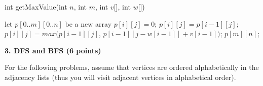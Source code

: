 \documentclass[12pt]{elsart}
\begin{document}
\begin{enumerate}
\begin{enumerate}
      \begin{algorithm}
        \caption{int getMaxValue(int $n$, int $m$, int $v$[], int $w$[])}
        \begin{algorithmic}
          \State let $p[0..m][0..n]$ be a new array
                      \State $p[i][j] = 0$;
                      \State $p[i][j] = p[i - 1][j]$;
                  \Else
                      \State $p[i][j] = max(p[i - 1][j]$, $p[i - 1][j - w[i - 1]] + v[i - 1])$;
                  \EndIf
              \EndFor
          \EndFor
           $p[m][n]$;
        \end{algorithmic}
      \end{algorithm}
   \end{enumerate}
\end{enumerate}

\newpage

{\bf 3.  DFS and BFS (6 points)}

For the following problems, assume that vertices are ordered alphabetically in the adjacency lists (thus you will visit adjacent vertices in alphabetical order).
\end{document}
